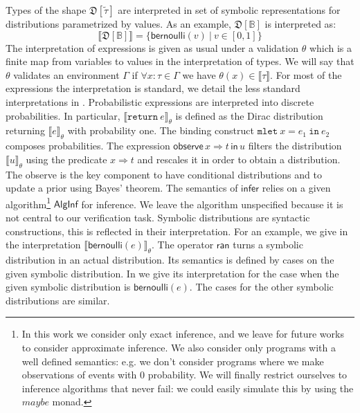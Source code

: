 \documentclass{sig-alternate-05-2015}
\theoremstyle{plain}
\theoremstyle{definition}
\theoremstyle{corollary}
\newcommand{\coty}[1]{\widetilde{#1}}
\def\kwin{\mathtt{in}}
\def\kwunit{\mathtt{return}}
\def\kwbind{\mathtt{mlet}}
\newcommand{\sunitM}[1]{\kwunit\ {#1}}
\newcommand{\sbindM}[3]{\kwbind\ {#1} = {#2}\ \kwin\ {#3}}
\newcommand{\stbool}[0]{\mathbb{B}}
\newcommand{\tyinterp}[1]{\llbracket {#1} \rrbracket}
\newcommand{\interp}[2]{\llbracket {#2} \rrbracket_{#1}}
\newcommand{\bernoulli}[1]{\mathsf{bernoulli}(#1) }
\newcommand{\stdist}[1]{\mathfrak{D}[{#1}]}
\begin{document}
Types of the shape $\stdist{\coty{\tau}}$ are interpreted in set of
symbolic representations for distributions parametrized by values. As an example, $\stdist{\stbool}$ is interpreted as:
$$
\tyinterp{\stdist{\stbool}}=
\big\{\bernoulli{v} \ |\ v\in [0,1]\big \} 
$$
The interpretation of expressions is given as usual under a validation
$\theta$ which is a finite map from variables to values in the
interpretation of types. We will say that $\theta$ validates an
environment $\Gamma$ if $\forall x:\tau\in \Gamma$ we have
$\theta(x)\in \tyinterp{\tau}$. 
For most of the expressions the interpretation is standard, we detail the
less standard interpretations in . Probabilistic
expressions are interpreted into discrete probabilities. In particular,
$\interp{\theta}{\sunitM{e}}$ is defined as the Dirac distribution
returning $\interp{\theta}{e}$ with probability one. The
binding construct $\sbindM{x}{e_1}{e_2}$ composes probabilities.
The expression  $\mathsf{observe}\, x\Rightarrow t\,  \mathsf{in}\, u$
filters the distribution $\interp{\theta}{u}$
 using the predicate $x\Rightarrow t$ and rescales it in order to obtain a
 distribution. The {\sf observe} is the key component to have conditional
 distributions and to update a prior using Bayes' theorem. The
 semantics of $\mathsf{infer}$ relies on a given algorithm\footnote{In this work we
  consider only exact inference, and we leave for future works to
  consider approximate inference. We also consider only programs with a well defined semantics: e.g. we don't consider
  programs where we make observations of events with 0 probability. We will finally restrict ourselves to inference algorithms that never fail:
 we could easily simulate this by using the $maybe$ monad.} $\mathsf{AlgInf}$ for
 inference. We leave the algorithm unspecified because it is not
 central to our verification task. 
Symbolic distributions are syntactic constructions, this is
reflected in their interpretation. For an example, we give in
 the interpretation
$\interp{\theta}{\bernoulli{e}}$. The operator $\mathsf{ran}$ turns a
symbolic distribution in an actual distribution. Its semantics is
defined by cases on the given symbolic distribution. In
 we give its interpretation for the case when the
given symbolic distribution is $\bernoulli{e}$. The cases for the
other symbolic distributions are similar. 
\end{document}
